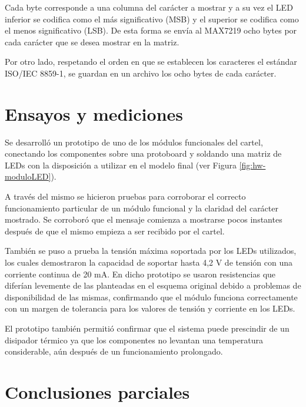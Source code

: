 Cada byte corresponde a una columna del carácter a mostrar y a su vez el LED inferior se codifica como el más significativo (MSB) y el superior se codifica como el menos significativo (LSB). De esta forma se envía al MAX7219 ocho bytes por cada carácter que se desea mostrar en la matriz.

Por otro lado, respetando el orden en que se establecen los caracteres el estándar ISO/IEC 8859-1, se guardan en un archivo los ocho bytes de cada carácter.

\section{Ensayos y mediciones}
Se desarrolló un prototipo de uno de los módulos funcionales del cartel, conectando los componentes sobre una protoboard y soldando una matriz de LEDs con la disposición a utilizar en el modelo final (ver Figura \ref{fig:hw-moduloLED}).

A través del mismo se hicieron pruebas para corroborar el correcto funcionamiento particular de un módulo funcional y la claridad del carácter mostrado. Se corroboró que el mensaje comienza a mostrarse pocos instantes después de que el mismo empieza a ser recibido por el cartel.

También se puso a prueba la tensión máxima soportada por los LEDs utilizados, los cuales demostraron la capacidad de soportar hasta 4,2 V de tensión con una corriente continua de 20 mA. En dicho prototipo se usaron resistencias que diferían levemente de las planteadas en el esquema original debido a problemas de disponibilidad de las mismas, confirmando que el módulo funciona correctamente con un margen de tolerancia para los valores de tensión y corriente en los LEDs.

El prototipo también permitió confirmar que el sistema puede prescindir de un disipador térmico ya que los componentes no levantan una temperatura considerable, aún después de un funcionamiento prolongado.


\section{Conclusiones parciales}

